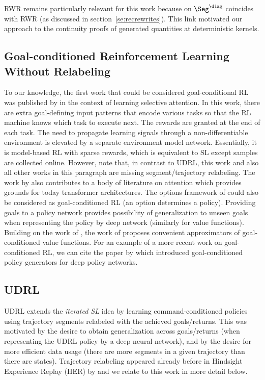 RWR remains particularly relevant for this work because \eUDRL{} on $\Seg^{\diag}$
coincides with RWR (as discussed in section~\ref{se:recrewrites}).
This link motivated our approach to the continuity proofs
of \eUDRL{} generated quantities at deterministic kernels.


\subsection{Goal-conditioned Reinforcement Learning Without Relabeling}
\label{sec:rw:gcrl}

To our knowledge, the first work that could be considered goal-conditional RL was published
by 
\citet{schmidhuber1991learning,schmidhuber1990learning} in the context of learning selective attention.
In this work, there are extra goal-defining input patterns that encode various tasks so that the RL machine knows which task to execute next.
The rewards are granted at the end of each task.
The need to propagate learning signals through a non-differentiable
environment is elevated by a separate environment model network.
Essentially, it is model-based RL with sparse rewards, which is equivalent to SL except samples are collected online.
However, note that, in contrast to UDRL, this work and also all other works in this paragraph are missing segment/trajectory relabeling.
The work by \citet{schmidhuber1991learning}
also contributes to a body of literature on attention which provides grounds for today transformer architectures.
The options framework of \citet{sutton1999between} could also be considered as goal-conditioned RL (an option determines a policy).
Providing goals to a policy network provides possibility of generalization to unseen goals when representing the policy by deep network (similarly for value functions).
Building on the work of \citet{sutton2011horde}, the work of \citet{schaul2015universal} proposes convenient approximators of goal-conditioned value functions.
For an example of a more recent work on goal-conditioned RL, we can cite the paper by \cite{faccio2023goal} which introduced goal-conditioned policy generators for deep policy networks.%


\subsection{UDRL}
\label{sec:rw:udrl}

UDRL \citep{schmidhuber2019reinforcement} extends the \emph{iterated SL} idea by
learning command-conditioned policies using
trajectory segments relabeled with the achieved goals/returns.
This was motivated by the desire to obtain
generalization across goals/returns (when representing the UDRL policy by
a deep neural network), and by the desire for
more efficient data usage (there are more segments in a given trajectory than there are states).
Trajectory relabeling appeared already before in Hindsight Experience Replay (HER) by \citet{andrychowicz2017hindsight} and we relate to this work in more detail below.

